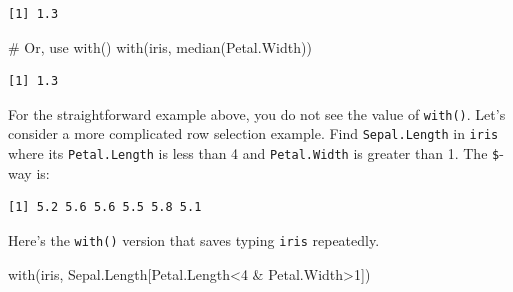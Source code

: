 \documentclass[
  letterpaper,
  DIV=11,
  numbers=noendperiod]{scrreprt}
\newenvironment{Shaded}{\begin{snugshade}}{\end{snugshade}}
\newcommand{\CommentTok}[1]{\textcolor[rgb]{0.37,0.37,0.37}{#1}}
\newcommand{\DecValTok}[1]{\textcolor[rgb]{0.68,0.00,0.00}{#1}}
\newcommand{\FunctionTok}[1]{\textcolor[rgb]{0.28,0.35,0.67}{#1}}
\newcommand{\NormalTok}[1]{\textcolor[rgb]{0.00,0.23,0.31}{#1}}
\newcommand{\SpecialCharTok}[1]{\textcolor[rgb]{0.37,0.37,0.37}{#1}}
\begin{document}
\begin{Shaded}
\end{Shaded}

\begin{verbatim}
[1] 1.3
\end{verbatim}

\begin{Shaded}
\begin{Highlighting}[]
\CommentTok{\# Or, use with()}
\FunctionTok{with}\NormalTok{(iris, }\FunctionTok{median}\NormalTok{(Petal.Width))}
\end{Highlighting}
\end{Shaded}

\begin{verbatim}
[1] 1.3
\end{verbatim}

For the straightforward example above, you do not see the value of
\texttt{with()}. Let's consider a more complicated row selection
example. Find \texttt{Sepal.Length} in \texttt{iris} where its
\texttt{Petal.Length} is less than 4 and \texttt{Petal.Width} is greater
than 1. The \texttt{\$}-way is:

\begin{Shaded}
\end{Shaded}

\begin{verbatim}
[1] 5.2 5.6 5.6 5.5 5.8 5.1
\end{verbatim}

Here's the \texttt{with()} version that saves typing \texttt{iris}
repeatedly.

\begin{Shaded}
\begin{Highlighting}[]
\FunctionTok{with}\NormalTok{(iris, Sepal.Length[Petal.Length}\SpecialCharTok{\textless{}}\DecValTok{4} \SpecialCharTok{\&}\NormalTok{ Petal.Width}\SpecialCharTok{\textgreater{}}\DecValTok{1}\NormalTok{])}
\end{Highlighting}
\end{Shaded}
\end{document}
